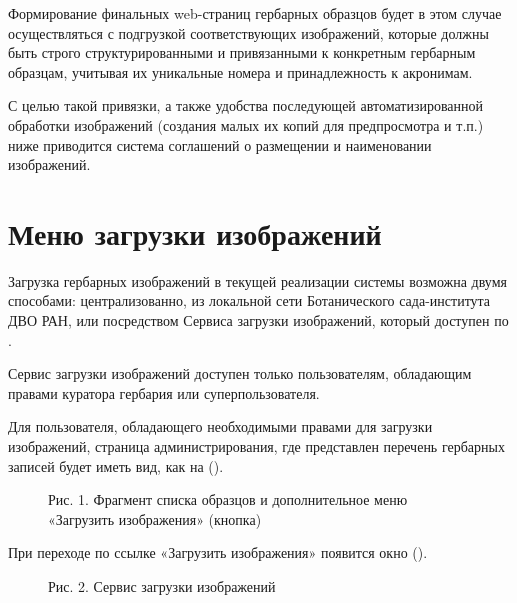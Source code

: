 \documentclass[letterpaper,10pt,russian]{sphinxmanual}
\begin{document}
Формирование финальных web-страниц гербарных образцов будет
в этом случае осуществляться с подгрузкой
соответствующих изображений, которые должны быть
строго структурированными и привязанными
к конкретным гербарным образцам, учитывая их уникальные номера и принадлежность к акронимам.

С целью  такой привязки, а также удобства последующей автоматизированной
обработки изображений (создания малых их копий для предпросмотра и т.п.)
ниже приводится система соглашений о размещении и наименовании изображений.

\ignorespaces 

\section{Меню загрузки изображений}
\label{\detokenize{scanning:id4}}\label{\detokenize{scanning:index-1}}
Загрузка гербарных изображений в текущей реализации системы
возможна двумя способами: централизованно, из локальной сети
Ботанического сада-института ДВО РАН, или посредством
Сервиса загрузки изображений, который доступен по .

Сервис загрузки изображений доступен только пользователям,
обладающим правами куратора гербария или суперпользователя.

Для пользователя, обладающего необходимыми правами для загрузки изображений,
страница администрирования, где представлен перечень гербарных записей
будет иметь вид, как на ({\hyperref[\detokenize{scanning:pic1}]{}}).

\begin{figure}[htbp]
\centering
\capstart

\noindent{}
\caption{Рис. 1. Фрагмент списка образцов и дополнительное меню «Загрузить изображения» (кнопка)}\label{\detokenize{scanning:pic1}}\label{\detokenize{scanning:id11}}\end{figure}

При переходе по ссылке «Загрузить изображения» появится окно ({\hyperref[\detokenize{scanning:pic2}]{}}).

\begin{figure}[htbp]
\centering
\capstart

\noindent{}
\caption{Рис. 2. Сервис загрузки изображений}\label{\detokenize{scanning:pic2}}\label{\detokenize{scanning:id12}}\end{figure}
\end{document}
